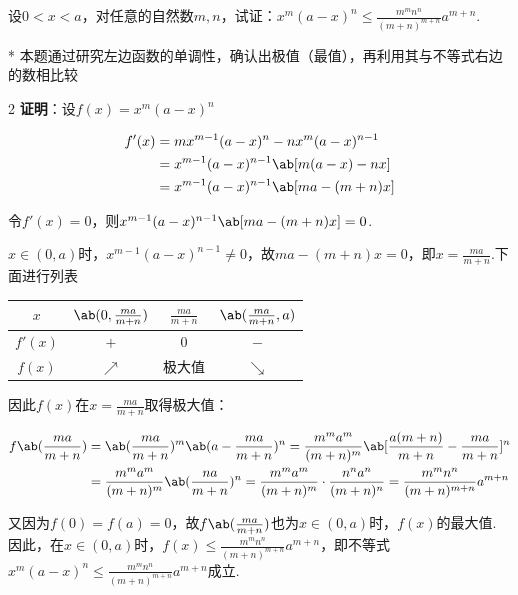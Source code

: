 \begin{problem}
    设$0<x<a$，对任意的自然数$m,n$，试证：$x^m(a-x) ^n\leq \frac{m^mn^n}{(m+n) ^{m+n}}a^{m+n}$.
\end{problem}
\begin{draft}
    \vspace{5em}
\end{draft}
\begin{solution}*
    本题通过研究左边函数的单调性，确认出极值（最值），再利用其与不等式右边的数相比较

\columnseprule=0.5pt
\begin{multicols}{2}
    \textbf{证明}：设$f(x) =x^m(a-x) ^n$

    \[\begin{aligned}
        f'(x)&=mx^{m-1}(a-x) ^n-nx^m(a-x) ^{n-1}\\
        &=x^{m-1}(a-x) ^{n-1}\ab[m(a-x) -nx ]\\
        &=x^{m-1}(a-x) ^{n-1}\ab[ma-(m+n) x ]
    \end{aligned}\]

    令$f'(x) =0$，则$x^{m-1}(a-x) ^{n-1}\ab[ma-(m+n) x ] =0$.
    
    $x\in (0,a)$时，$x^{m-1}(a-x) ^{n-1}\ne 0$，故$ma-(m+n) x=0$，即$x=\frac{ma}{m+n}$.下面进行列表

\begin{center}
    \begin{tabular}{c|c|c|c}
        \toprule
        $x$&		$\ab(0,\frac{ma}{m+n})$&		$\frac{ma}
        {m+n}$&		$\ab(\frac{ma}{m+n},a)$\\
        \midrule
        $f'(x)$&		$+$&		$0$&		$-$\\
        $f(x)$&		$\nearrow$&	极大值&$\searrow$\\
        \bottomrule
    \end{tabular}
\end{center}
\end{multicols}
        
    因此$f(x)$在$x=\frac{ma}{m+n}$取得极大值：

    \[\begin{aligned}
        f\ab(\frac{ma}{m+n} )&=\ab(\frac{ma}{m+n} )^m\ab(a-\frac{ma}{m+n} )^n=\frac{m^ma^m}{(m+n) ^m}\ab[\frac{a(m+n)}{m+n}-\frac{ma}{m+n} ] ^n\\
        &=\frac{m^ma^m}{(m+n) ^m}\ab(\frac{na}{m+n} )^n=\frac{m^ma^m}{(m+n) ^m}\cdot \frac{n^na^n}{(m+n) ^n}=\frac{m^mn^n}{(m+n) ^{m+n}}a^{m+n}
    \end{aligned}\]

    又因为$f(0) =f(a) =0$，故$f\ab(\frac{ma}{m+n})$也为$x\in (0,a)$时，$f(x)$的最大值. 因此，在$x\in (0,a)$时，$f(x) \leq \frac{m^mn^n}{(m+n) ^{m+n}}a^{m+n}$，即不等式$x^m(a-x) ^n\leq \frac{m^mn^n}{(m+n) ^{m+n}}a^{m+n}$成立.
\end{solution}

